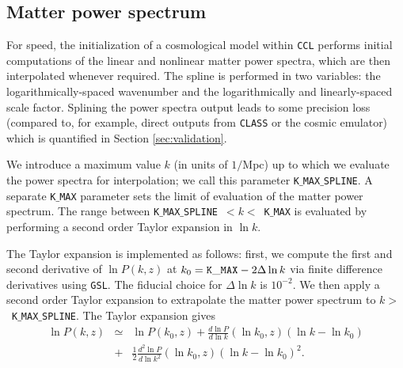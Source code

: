 \documentclass[\docopts]{\docclass}
\begin{document}
\subsection{Matter power spectrum}

For speed, the initialization of a cosmological model within {\tt CCL} performs initial computations of the linear and nonlinear matter power spectra, which are then interpolated whenever required. The spline is performed in two variables: the logarithmically-spaced wavenumber and the logarithmically and linearly-spaced scale factor. Splining the power spectra output leads to some precision loss (compared to, for example, direct outputs from {\tt CLASS} or the cosmic emulator) which is quantified in Section \ref{sec:validation}.

We introduce a maximum value $k$ (in units of $1/$Mpc) up to which we evaluate the power spectra for interpolation; we call this parameter {\tt K$\_$MAX$\_$SPLINE}. A separate {\tt K$\_$MAX} parameter sets the limit of evaluation of the matter power spectrum. The range between {\tt K$\_$MAX$\_$SPLINE}~$<k<$~{\tt K$\_$MAX} is evaluated by performing a second order Taylor expansion in $\ln k$.

The Taylor expansion is implemented as follows: first, we compute the first and second derivative of $\ln P(k,z)$ at $k_0={\rm \tt K\_MAX}-2\Delta\ln k$ via finite difference derivatives using {\tt GSL}. The fiducial choice for $\Delta\ln k$ is $10^{-2}$. We then apply a second order Taylor expansion to extrapolate the matter power spectrum to $k>$~{\tt K$\_$MAX$\_$SPLINE}. The Taylor expansion gives
%
\begin{eqnarray}
  \ln P(k,z) &\simeq& \ln P(k_0,z) + \frac{d\ln P}{d\ln k}(\ln k_0,z) (\ln k-\ln k_0)  \nonumber\\
  &+& \frac{1}{2}  \frac{d^2\ln P}{d\ln k^2}(\ln k_0,z) (\ln k-\ln k_0)^2.
  \label{eq:NLPSTaylor}
\end{eqnarray}
\end{document}
